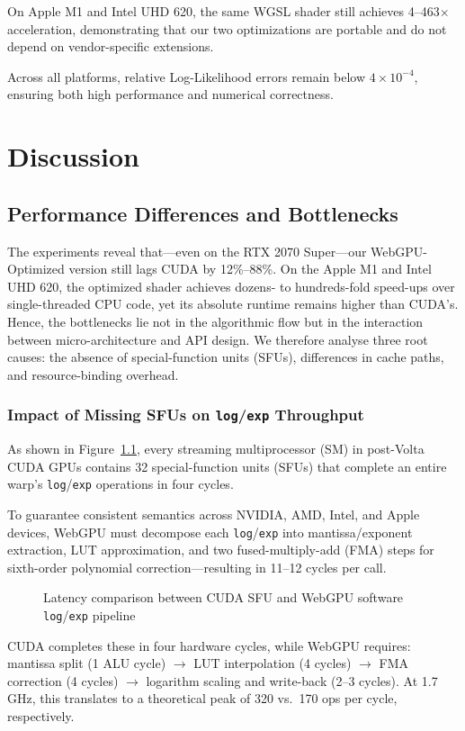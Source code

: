 \documentclass[PhD]{PHlab-thesis}
\begin{document}
On Apple M1 and Intel UHD 620, the same WGSL shader still achieves 4–463$\times$ acceleration, demonstrating that our two optimizations are portable and do not depend on vendor-specific extensions.

Across all platforms, relative Log-Likelihood errors remain below $4 \times 10^{-4}$, ensuring both high performance and numerical correctness.


\chapter{Discussion}
\section{Performance Differences and Bottlenecks}
The experiments reveal that—even on the RTX 2070 Super—our WebGPU-Optimized version still lags CUDA by 12\%–88\%. On the Apple M1 and Intel UHD 620, the optimized shader achieves dozens- to hundreds-fold speed-ups over single-threaded CPU code, yet its absolute runtime remains higher than CUDA's. Hence, the bottlenecks lie not in the algorithmic flow but in the interaction between micro-architecture and API design. We therefore analyse three root causes: the absence of special-function units (SFUs), differences in cache paths, and resource-binding overhead.

\subsection{Impact of Missing SFUs on \texttt{log}/\texttt{exp} Throughput}
As shown in Figure~\ref{fig:log_exp_pipeline}, every streaming multiprocessor (SM) in post-Volta CUDA GPUs contains 32 special-function units (SFUs) that complete an entire warp's \texttt{log}/\texttt{exp} operations in four cycles.

To guarantee consistent semantics across NVIDIA, AMD, Intel, and Apple devices, WebGPU must decompose each \texttt{log}/\texttt{exp} into mantissa/exponent extraction, LUT approximation, and two fused-multiply-add (FMA) steps for sixth-order polynomial correction—resulting in 11–12 cycles per call.

\begin{figure}[h]
    \caption{Latency comparison between CUDA SFU and WebGPU software \texttt{log}/\texttt{exp} pipeline}
    \label{fig:log_exp_pipeline}
\end{figure}

CUDA completes these in four hardware cycles, while WebGPU requires:
mantissa split (1 ALU cycle) $\rightarrow$ LUT interpolation (4 cycles) $\rightarrow$ FMA correction (4 cycles) $\rightarrow$ logarithm scaling and write-back (2–3 cycles). At 1.7 GHz, this translates to a theoretical peak of 320 vs.\ 170 ops per cycle, respectively.
\end{document}

